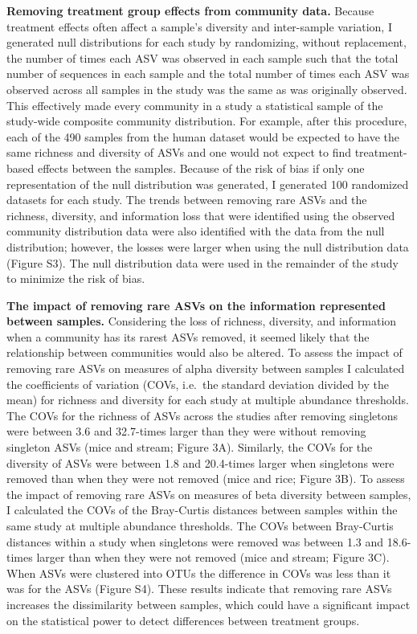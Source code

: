 \documentclass[
]{article}
\begin{document}
\textbf{Removing treatment group effects from community data.} Because
treatment effects often affect a sample's diversity and inter-sample
variation, I generated null distributions for each study by randomizing,
without replacement, the number of times each ASV was observed in each
sample such that the total number of sequences in each sample and the
total number of times each ASV was observed across all samples in the
study was the same as was originally observed. This effectively made
every community in a study a statistical sample of the study-wide
composite community distribution. For example, after this procedure,
each of the 490 samples from the human dataset would be expected to have
the same richness and diversity of ASVs and one would not expect to find
treatment-based effects between the samples. Because of the risk of bias
if only one representation of the null distribution was generated, I
generated 100 randomized datasets for each study. The trends between
removing rare ASVs and the richness, diversity, and information loss
that were identified using the observed community distribution data were
also identified with the data from the null distribution; however, the
losses were larger when using the null distribution data (Figure S3).
The null distribution data were used in the remainder of the study to
minimize the risk of bias.

\textbf{The impact of removing rare ASVs on the information represented
between samples.} Considering the loss of richness, diversity, and
information when a community has its rarest ASVs removed, it seemed
likely that the relationship between communities would also be altered.
To assess the impact of removing rare ASVs on measures of alpha
diversity between samples I calculated the coefficients of variation
(COVs, i.e.~the standard deviation divided by the mean) for richness and
diversity for each study at multiple abundance thresholds. The COVs for
the richness of ASVs across the studies after removing singletons were
between 3.6 and 32.7-times larger than they were without removing
singleton ASVs (mice and stream; Figure 3A). Similarly, the COVs for the
diversity of ASVs were between 1.8 and 20.4-times larger when singletons
were removed than when they were not removed (mice and rice; Figure 3B).
To assess the impact of removing rare ASVs on measures of beta diversity
between samples, I calculated the COVs of the Bray-Curtis distances
between samples within the same study at multiple abundance thresholds.
The COVs between Bray-Curtis distances within a study when singletons
were removed was between 1.3 and 18.6-times larger than when they were
not removed (mice and stream; Figure 3C). When ASVs were clustered into
OTUs the difference in COVs was less than it was for the ASVs (Figure
S4). These results indicate that removing rare ASVs increases the
dissimilarity between samples, which could have a significant impact on
the statistical power to detect differences between treatment groups.
\end{document}
